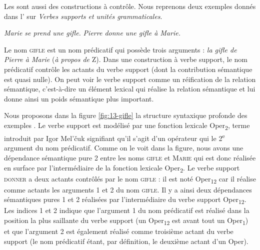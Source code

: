 Les  sont aussi des constructions à contrôle. Nous reprenons deux exemples donnés dans l’ sur \textit{Verbes supports et unités grammaticales}.

\ea\label{ex:13-gifle}
\ea \textit{Marie se prend une gifle.}
\ex \textit{Pierre donne une gifle à Marie.}\z\z

Le nom \textsc{gifle} est un nom prédicatif qui possède trois arguments : \textit{la gifle de Pierre à Marie} (\textit{à propos de} Z). Dans une construction à verbe support, le nom prédicatif contrôle les actants du verbe support (dont la contribution sémantique est quasi nulle). On peut voir le verbe support comme un réification de la relation sémantique, c’est-à-dire un élément lexical qui réalise la relation sémantique et lui donne ainsi un poids sémantique plus important.

Nous proposons dans la figure \ref{fig:13-gifle} la structure syntaxique profonde des exem\-ples . Le verbe support  est modélisé par une fonction lexicale Oper\textsubscript{2}, terme introduit par Igor Mel’\v cuk signifiant qu’il s’agit d’un opérateur qui  le 2\textsuperscript{e} argument du nom prédicatif. Comme on le voit dans la figure, nous avons une dépendance sémantique pure 2 entre les noms \textsc{gifle} et \textsc{Marie} qui est donc réalisée en surface par l'intermédiaire de la fonction lexicale Oper\textsubscript{2}. Le verbe support \textsc{donner} a deux actants contrôlés par le nom \textsc{gifle} : il est noté Oper\textsubscript{12} car il réalise comme actants les arguments 1 et 2 du nom \textsc{gifle}. Il y a ainsi deux dépendances sémantiques pures 1 et 2 réalisées par l'intermédiaire du verbe support Oper\textsubscript{12}. Les indices 1 et 2 indique que l'argument 1 du nom prédicatif est réalisé dans la position la plus saillante du verbe support (un Oper\textsubscript{12} est avant tout un Oper\textsubscript{1}) et que l'argument 2 est également réalisé comme troisième actant du verbe support (le nom prédicatif étant, par définition, le deuxième actant d'un Oper).

